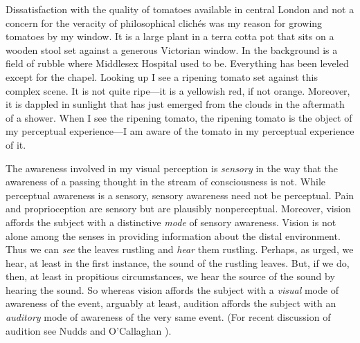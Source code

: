 \documentclass[12pt]{article}
\begin{document}
Dissatisfaction with the quality of tomatoes available in central London and not a concern for the veracity of philosophical clichés was my reason for growing tomatoes by my window. It is a large plant in a terra cotta pot that sits on a wooden stool set against a generous Victorian window. In the background is a field of rubble where Middlesex Hospital used to be. Everything has been leveled except for the chapel. Looking up I see a ripening tomato set against this complex scene. It is not quite ripe---it is a yellowish red, if not orange. Moreover, it is dappled in sunlight that has just emerged from the clouds in the aftermath of a shower. When I see the ripening tomato, the ripening tomato is the object of my perceptual experience---I am aware of the tomato in my perceptual experience of it. 

The awareness involved in my visual perception is \emph{sensory} in the way that the awareness of a passing thought in the stream of consciousness is not. While perceptual awareness is a sensory, sensory awareness need not be perceptual. Pain and proprioception are sensory but are plausibly nonperceptual. Moreover, vision affords the subject with a distinctive \emph{mode} of sensory awareness. Vision is not alone among the senses in providing information about the distal environment. Thus we can \emph{see} the leaves rustling and \emph{hear} them rustling. Perhaps, as \citet[]{Berkeley:1734fk} urged, we hear, at least in the first instance, the sound of the rustling leaves. But, if we do, then, at least in propitious circumstances, we hear the source of the sound by hearing the sound. So whereas vision affords the subject with a \emph{visual} mode of awareness of the event, arguably at least, audition affords the subject with an \emph{auditory} mode of awareness of the very same event. (For recent discussion of audition see Nudds and O'Callaghan \citeyear{Nudds:2009sk}).
\end{document}
